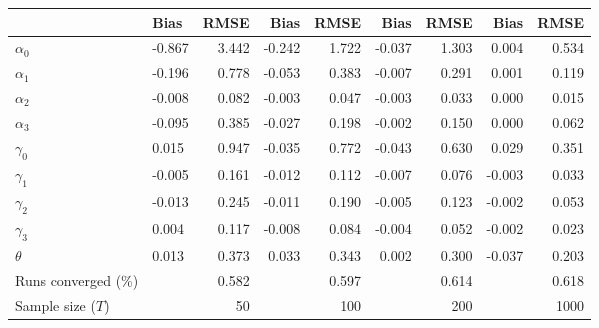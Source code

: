 
\begin{tabular}[t]{llrrrrrrr}
\toprule
  & Bias & RMSE & Bias & RMSE & Bias & RMSE & Bias & RMSE\\
\midrule
$\alpha_{0}$ & -0.867 & 3.442 & -0.242 & 1.722 & -0.037 & 1.303 & 0.004 & 0.534\\
$\alpha_{1}$ & -0.196 & 0.778 & -0.053 & 0.383 & -0.007 & 0.291 & 0.001 & 0.119\\
$\alpha_{2}$ & -0.008 & 0.082 & -0.003 & 0.047 & -0.003 & 0.033 & 0.000 & 0.015\\
$\alpha_{3}$ & -0.095 & 0.385 & -0.027 & 0.198 & -0.002 & 0.150 & 0.000 & 0.062\\
$\gamma_{0}$ & 0.015 & 0.947 & -0.035 & 0.772 & -0.043 & 0.630 & 0.029 & 0.351\\
$\gamma_{1}$ & -0.005 & 0.161 & -0.012 & 0.112 & -0.007 & 0.076 & -0.003 & 0.033\\
$\gamma_{2}$ & -0.013 & 0.245 & -0.011 & 0.190 & -0.005 & 0.123 & -0.002 & 0.053\\
$\gamma_{3}$ & 0.004 & 0.117 & -0.008 & 0.084 & -0.004 & 0.052 & -0.002 & 0.023\\
$\theta$ & 0.013 & 0.373 & 0.033 & 0.343 & 0.002 & 0.300 & -0.037 & 0.203\\
Runs converged (\%) &  & 0.582 &  & 0.597 &  & 0.614 &  & 0.618\\
Sample size ($T$) &  & 50 &  & 100 &  & 200 &  & 1000\\
\bottomrule
\end{tabular}
